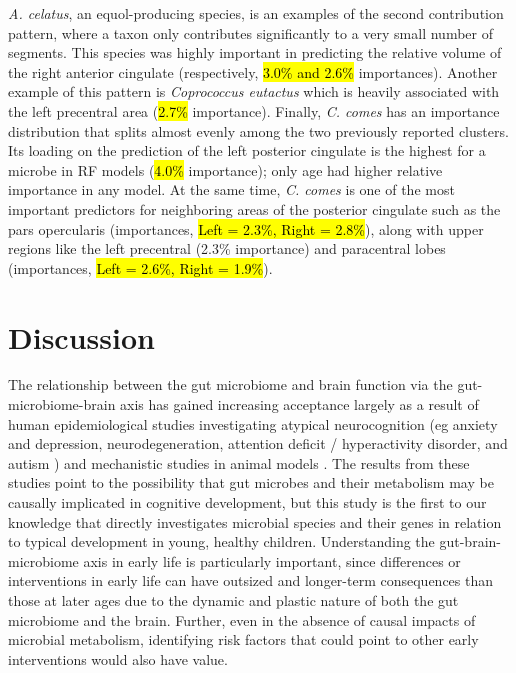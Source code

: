 \documentclass{article}
\begin{document}
\emph{A. celatus}, an equol-producing species, is an examples of the second contribution
pattern, where a taxon only contributes significantly to a very small number of segments. 
This species was highly important in predicting the relative volume of
the right anterior cingulate (respectively, \hl{3.0\% and 2.6\%} importances).
Another example of this pattern is \emph{Coprococcus eutactus}
which is heavily associated with the left precentral area (\hl{2.7\%} importance). 
Finally, \emph{C. comes} has an importance
distribution that splits almost evenly among the two previously reported
clusters. Its loading on the prediction of the left posterior cingulate
is the highest for a microbe in RF models (\hl{4.0\%} importance);
only age had higher relative importance in any model. At the same time,
\textit{C. comes} is one of the most important predictors for neighboring areas of the
posterior cingulate such as the pars opercularis (importances,
\hl{Left = 2.3\%, Right = 2.8\%}), along with upper regions like the left
precentral (2.3\% importance) and paracentral lobes (importances, \hl{Left = 2.6\%, Right = 1.9\%}).

\section*{Discussion}

The relationship between the gut microbiome and brain function via the
gut-microbiome-brain axis has gained increasing acceptance largely as a
result of human epidemiological studies investigating atypical
neurocognition (eg anxiety and depression, neurodegeneration, attention
deficit / hyperactivity disorder, and autism \cite{romanGutBrainAxis2018,fosterGutBrainAxis2013})
and mechanistic studies in animal models
\cite{hsiaoMicrobiotaModulateBehavioral2013,needhamGutderivedMetaboliteAlters2022}.
The results from these studies point to the possibility
that gut microbes and their metabolism may be causally implicated in
cognitive development, but this study is the first to our knowledge that
directly investigates microbial species and their genes in relation to
typical development in young, healthy children. Understanding the gut-brain-microbiome axis
in early life is particularly important, since differences or
interventions in early life can have outsized and longer-term
consequences than those at later ages
due to the dynamic and plastic nature of both the gut microbiome and the brain.
Further, even in the absence of
causal impacts of microbial metabolism, identifying risk factors that
could point to other early interventions would also have value.
\end{document}
